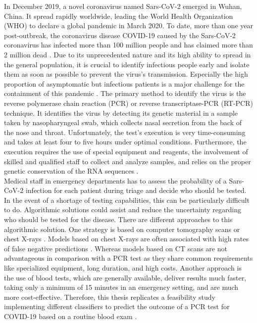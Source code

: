 In December 2019, a novel coronavirus named Sars-CoV-2 emerged in Wuhan, China. 
It spread rapidly worldwide, leading the World Health Organization (WHO) 
to declare a global pandemic in March 2020. To date, more than one year 
post-outbreak, the coronavirus disease COVID-19 caused by the Sars-CoV-2 
coronavirus has infected more than 100 million people and has claimed more than 
2 million dead \cite{RN204}. Due to its unprecedented nature and its high 
ability to spread in the general population, it is crucial to identify 
infectious people early and isolate them as soon as possible to 
prevent the virus's transmission. 
Especially the high proportion of asymptomatic but infectious patients is a 
major challenge for the containment of this pandemic \cite{RN205}. The primary 
method to identify the virus is the reverse polymerase chain reaction (PCR) or 
reverse transcriptase-PCR (RT-PCR) technique. It identifies the virus by 
detecting its genetic material in a sample taken by nasopharyngeal swab, which 
collects nasal secretion from the back of the nose and throat. Unfortunately, 
the test's execution is very time-consuming and takes at least four to five 
hours under optimal conditions. 
Furthermore, the execution requires the use of special equipment and reagents, 
the involvement of skilled and qualified staff to collect and analyze samples, 
and relies on the proper genetic conservation of the RNA sequences 
\cite{RN201, RN202}.
\\
Medical staff in emergency departments has to assess the probability of a 
Sars-CoV-2 infection for each patient during triage and decide 
who should be tested. In the event of a shortage of testing capabilities, this 
can be particularly difficult to do. Algorithmic solutions could assist and 
reduce the uncertainty regarding who should be tested for the 
disease. There are different approaches to this algorithmic solution.
One strategy is based on computer tomography scans or chest X-rays 
\cite{RN200}. Models based on chest X-rays are often associated with high rates 
of false negative predictions \cite{RN200, RN206}. Whereas models based on CT 
scans are not advantageous in comparison with a PCR test as they share common 
requirements like specialized equipment, long duration, and high costs.
Another approach is the use of blood tests, which are generally available, 
deliver results much faster, taking only a minimum of 15 minutes in an 
emergency setting, and are much more cost-effective.
Therefore, this thesis replicates a feasibility study implementing different 
classifiers to predict the outcome of a PCR test for COVID-19 based on a 
routine blood exam \cite{RN127}.
